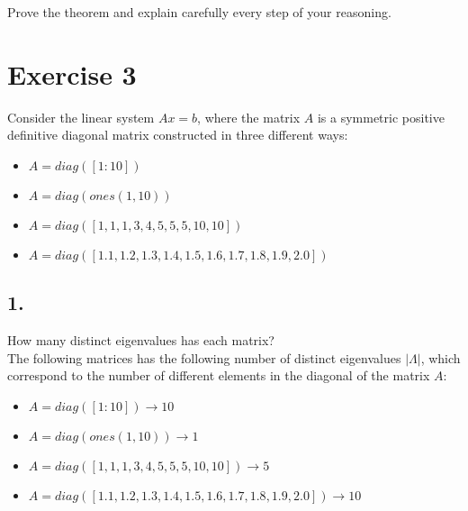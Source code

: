 \documentclass[unicode,11pt,a4paper,oneside,numbers=endperiod,openany]{scrartcl}
\begin{document}
\noindent Prove the theorem and explain carefully every step of your reasoning.\\




\clearpage

\section*{Exercise 3}

Consider the linear system $Ax = b$,
where the matrix $A$ is a symmetric positive definitive diagonal matrix
constructed in three different ways:

\begin{itemize}
    \item[ ] $A = diag([1:10])$
    \item[ ] $A = diag(ones(1,10))$
    \item[ ] $A = diag([1, 1, 1, 3, 4, 5, 5, 5, 10, 10])$
    \item[ ] $A = diag([1.1, 1.2, 1.3, 1.4, 1.5, 1.6, 1.7, 1.8, 1.9, 2.0])$
\end{itemize}

\subsection*{1.}
How many distinct eigenvalues has each matrix?\\

The following matrices has the following number of distinct eigenvalues $| \Lambda |$,
which correspond to the number of different elements in the diagonal of the matrix $A$:
\begin{itemize}
    \item[ ] $A = diag([1:10]) \rightarrow 10$
    \item[ ] $A = diag(ones(1,10)) \rightarrow 1$
    \item[ ] $A = diag([1, 1, 1, 3, 4, 5, 5, 5, 10, 10]) \rightarrow 5$
    \item[ ] $A = diag([1.1, 1.2, 1.3, 1.4, 1.5, 1.6, 1.7, 1.8, 1.9, 2.0]) \rightarrow 10$
\end{itemize}
\end{document}

